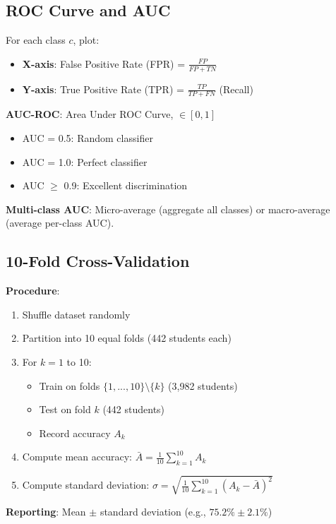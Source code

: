 \subsection{ROC Curve and AUC}

For each class $c$, plot:
\begin{itemize}
\item \textbf{X-axis}: False Positive Rate (FPR) = $\frac{FP}{FP + TN}$
\item \textbf{Y-axis}: True Positive Rate (TPR) = $\frac{TP}{TP + FN}$ (Recall)
\end{itemize}

\textbf{AUC-ROC}: Area Under ROC Curve, $\in [0, 1]$
\begin{itemize}
\item AUC = 0.5: Random classifier
\item AUC = 1.0: Perfect classifier
\item AUC $\geq$ 0.9: Excellent discrimination
\end{itemize}

\textbf{Multi-class AUC}: Micro-average (aggregate all classes) or macro-average (average per-class AUC).

\subsection{10-Fold Cross-Validation}

\textbf{Procedure}:
\begin{enumerate}
\item Shuffle dataset randomly
\item Partition into 10 equal folds (442 students each)
\item For $k = 1$ to 10:
\begin{itemize}
\item Train on folds $\{1,...,10\} \setminus \{k\}$ (3,982 students)
\item Test on fold $k$ (442 students)
\item Record accuracy $A_k$
\end{itemize}
\item Compute mean accuracy: $\bar{A} = \frac{1}{10} \sum_{k=1}^{10} A_k$
\item Compute standard deviation: $\sigma = \sqrt{\frac{1}{10} \sum_{k=1}^{10} (A_k - \bar{A})^2}$
\end{enumerate}

\textbf{Reporting}: Mean $\pm$ standard deviation (e.g., $75.2\% \pm 2.1\%$)

